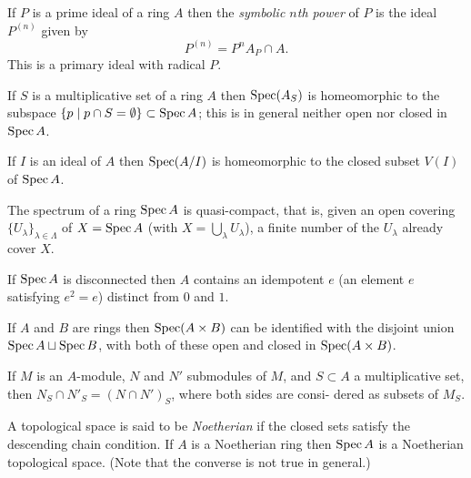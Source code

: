 \begin{exercise}\label{ex:4.2-ex}
If $P$ is a prime ideal of a ring $A$ then the \emph{symbolic $n$th power} of $P$ is the ideal
$P^{(n)}$ given by
\[
  P^{(n)} = P^nA_P \cap A.
\]
This is a primary ideal with radical $P$.
\end{exercise}

\begin{exercise}\label{ex:4.3-ex}
If $S$ is a multiplicative set of a ring $A$ then $\operatorname{Spec}(A_S)$ is homeomorphic to
the subspace $\{p \mid p \cap S = \emptyset\} \subset \operatorname{Spec} A$; this is in general neither open nor
closed in $\operatorname{Spec} A$.
\end{exercise}

\begin{exercise}\label{ex:4.4-ex}
If $I$ is an ideal of $A$ then $\operatorname{Spec}(A/I)$ is homeomorphic to the closed subset
$V(I)$ of $\operatorname{Spec} A$.
\end{exercise}

\begin{exercise}\label{ex:4.5-ex}
The spectrum of a ring $\operatorname{Spec} A$ is quasi-compact, that is, given an open
covering $\{U_\lambda\}_{\lambda \in \Lambda}$ of $X = \operatorname{Spec} A$ (with $X = \bigcup_\lambda U_\lambda$), a finite number of the
$U_\lambda$ already cover $X$.
\end{exercise}

\begin{exercise}\label{ex:4.6-ex}
If $\operatorname{Spec} A$ is disconnected then $A$ contains an idempotent $e$ (an element $e$
satisfying $e^2 = e$) distinct from $0$ and $1$.
\end{exercise}

\begin{exercise}\label{ex:4.7-ex}
If $A$ and $B$ are rings then $\operatorname{Spec}(A \times B)$ can be identified with the disjoint
union $\operatorname{Spec} A \sqcup \operatorname{Spec} B$, with both of these open and closed in
$\operatorname{Spec}(A \times B)$.
\end{exercise}

\begin{exercise}\label{ex:4.8-ex}
If $M$ is an $A$-module, $N$ and $N'$ submodules of $M$, and $S \subset A$ a
multiplicative set, then $N_S \cap N'_S = (N \cap N')_S$, where both sides are consi-
dered as subsets of $M_S$.
\end{exercise}

\begin{exercise}\label{ex:4.9-ex}
A topological space is said to be \emph{Noetherian} if the closed sets satisfy the
descending chain condition. If $A$ is a Noetherian ring then $\operatorname{Spec} A$ is a
Noetherian topological space. (Note that the converse is not true in
general.)
\end{exercise}

